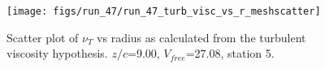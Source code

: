 \begin{figure}[H]
\centering
\texttt{[image: figs/run\_47/run\_47\_turb\_visc\_vs\_r\_meshscatter]}
\caption{Scatter plot of $\nu_T$ vs radius as calculated from the turbulent viscosity hypothesis. $z/c$=9.00, $V_{free}$=27.08, station 5.}
\label{fig:run_47_turb_visc_vs_r_meshscatter}
\end{figure}


